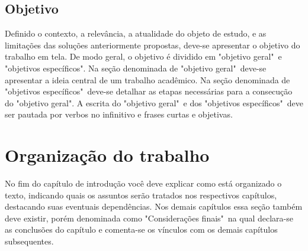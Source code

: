 \subsection{Objetivo}
Definido o contexto, a relevância, a atualidade do objeto de estudo, e as limitações das soluções anteriormente propostas, deve-se apresentar o objetivo do trabalho em tela. De modo geral, o objetivo é dividido em "objetivo geral"\ e "objetivos específicos". Na seção denominada de "objetivo geral"\ deve-se apresentar a ideia central de um trabalho acadêmico. Na seção denominada de "objetivos específicos"\ deve-se detalhar as etapas necessárias para a consecução do "objetivo geral". A escrita do "objetivo geral"\ e dos "objetivos específicos"\ deve ser pautada por verbos no infinitivo e frases curtas e objetivas.

\section{Organização do trabalho}
No fim do capítulo de introdução você deve explicar como está organizado o texto, indicando quais os assuntos serão tratados nos respectivos capítulos, destacando suas eventuais dependências. Nos demais capítulos essa seção também deve existir, porém denominada como "Considerações finais"\ na qual declara-se as conclusões do capítulo e comenta-se os vínculos com os demais capítulos subsequentes.
